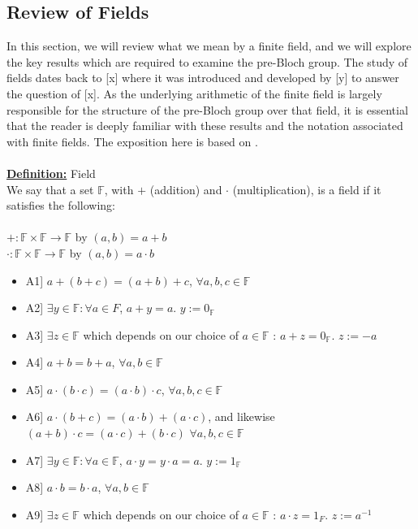 \documentclass[11pt]{article}
\theoremstyle{plain}
\theoremstyle{definition}
\begin{document}
\subsection{Review of Fields}\label{section:Review of Fields}

In this section, we will review what we mean by a finite field, and we will explore the key results which are required to examine the pre-Bloch group. The study of fields dates back to [x] where it was introduced and developed by [y] to answer the question of [x]. As the underlying arithmetic of the finite field is largely responsible for the structure of the pre-Bloch group over that field, it is essential that the reader is deeply familiar with these results and the notation associated with finite fields. The exposition here is based on \cite{Algebra}.  \\
\\
\textbf{\underline{Definition:}} Field \\
We say that a set $\mathbb{F} $, with $+$ (addition) and $\cdot$  (multiplication), is a field if it satisfies the following:
\\
\\ $+: \mathbb{F}  \times \mathbb{F}  \rightarrow \mathbb{F} $ by $(a,b) = a+b $
\\$\cdot : \mathbb{F}  \times \mathbb{F}  \rightarrow \mathbb{F} $ by $(a,b) = a \cdot b $
  \begin{itemize}
	\item A1] $a+(b+c) = (a+b)+c$, $\forall a,b,c \in \mathbb{F} $
	
	\item A2] $\exists y \in \mathbb{F}  : \forall a \in F$,  $a+y = a$.  $y:=0_\mathbb{F}$
	
	\item A3] $\exists z \in \mathbb{F} $ which depends on our choice of $a \in \mathbb{F} $ : $a+z = 0_\mathbb{F} $.   $z:= -a$
	
	\item A4] $a+b = b+a$, $\forall a,b \in \mathbb{F} $
	
	\item A5] $a \cdot (b \cdot c) = (a \cdot b) \cdot c$, $\forall a,b,c \in \mathbb{F} $
	
	\item A6] $ a \cdot (b +  c) = (a \cdot b)+(a \cdot c)$, and likewise $(a + b) \cdot c = (a \cdot c)+(b \cdot c)$ $\forall a,b,c \in \mathbb{F} $
	
	\item A7] $\exists y \in \mathbb{F}  : \forall a \in \mathbb{F} $,  $a \cdot y = y \cdot a = a$.  $y:=1_\mathbb{F} $
	
	\item A8] $a \cdot b = b \cdot a$, $\forall a,b \in \mathbb{F} $
	
	\item A9] $\exists z \in \mathbb{F} $ which depends on our choice of $a \in \mathbb{F} $ : $a \cdot z = 1_F$.  $z:= a^{-1}$	
  \end{itemize}
\end{document}
